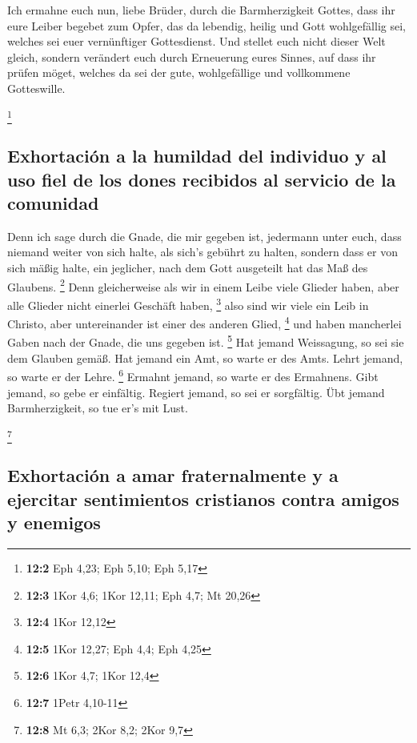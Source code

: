  Ich ermahne euch nun, liebe Brüder, durch die
Barmherzigkeit Gottes, dass ihr eure Leiber begebet zum Opfer, das da
lebendig, heilig und Gott wohlgefällig sei, welches sei euer
vernünftiger Gottesdienst.  Und stellet euch nicht dieser
Welt gleich, sondern verändert euch durch Erneuerung eures Sinnes, auf
dass ihr prüfen möget, welches da sei der gute, wohlgefällige und
vollkommene Gotteswille.

\footnote{\textbf{12:2} Eph 4,23; Eph 5,10; Eph 5,17}

\hypertarget{exhortaciuxf3n-a-la-humildad-del-individuo-y-al-uso-fiel-de-los-dones-recibidos-al-servicio-de-la-comunidad}{%
\subsection{Exhortación a la humildad del individuo y al uso fiel de los
dones recibidos al servicio de la
comunidad}\label{exhortaciuxf3n-a-la-humildad-del-individuo-y-al-uso-fiel-de-los-dones-recibidos-al-servicio-de-la-comunidad}}

 Denn ich sage durch die Gnade, die mir gegeben ist,
jedermann unter euch, dass niemand weiter von sich halte, als sich's
gebührt zu halten, sondern dass er von sich mäßig halte, ein jeglicher,
nach dem Gott ausgeteilt hat das Maß des Glaubens. \footnote{\textbf{12:3}
  1Kor 4,6; 1Kor 12,11; Eph 4,7; Mt 20,26}  Denn
gleicherweise als wir in einem Leibe viele Glieder haben, aber alle
Glieder nicht einerlei Geschäft haben, \footnote{\textbf{12:4} 1Kor
  12,12}  also sind wir viele ein Leib in Christo, aber
untereinander ist einer des anderen Glied, \footnote{\textbf{12:5} 1Kor
  12,27; Eph 4,4; Eph 4,25}  und haben mancherlei Gaben
nach der Gnade, die uns gegeben ist. \footnote{\textbf{12:6} 1Kor 4,7;
  1Kor 12,4}  Hat jemand Weissagung, so sei sie dem
Glauben gemäß. Hat jemand ein Amt, so warte er des Amts. Lehrt jemand,
so warte er der Lehre. \footnote{\textbf{12:7} 1Petr 4,10-11}
 Ermahnt jemand, so warte er des Ermahnens. Gibt jemand,
so gebe er einfältig. Regiert jemand, so sei er sorgfältig. Übt jemand
Barmherzigkeit, so tue er's mit Lust.

\footnote{\textbf{12:8} Mt 6,3; 2Kor 8,2; 2Kor 9,7}

\hypertarget{exhortaciuxf3n-a-amar-fraternalmente-y-a-ejercitar-sentimientos-cristianos-contra-amigos-y-enemigos}{%
\subsection{Exhortación a amar fraternalmente y a ejercitar sentimientos
cristianos contra amigos y
enemigos}\label{exhortaciuxf3n-a-amar-fraternalmente-y-a-ejercitar-sentimientos-cristianos-contra-amigos-y-enemigos}}

